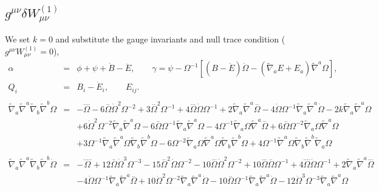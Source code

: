 \documentclass[10pt,letterpaper]{article}
\numberwithin{equation}{section}
\begin{document}
\subsection{$g^{\mu\nu}\delta W_{\mu\nu}^{(1)}$}
We set $k=0$ and substitute the gauge invariants and null trace condition ($g^{\mu\nu} W^{(1)}_{\mu\nu}=0$),
\begin{eqnarray}
\alpha &=& \phi + \psi +\dot B - \ddot E,\qquad \gamma = \psi -\Omega^{-1}[(B-\dot E)\dot\Omega - (\tilde\nabla_a E + E_a)\tilde\nabla^a \Omega],
\nonumber\\
Q_i&=& B_i - \dot E_i,\qquad E_{ij}.
\\\nonumber\\
\tilde\nabla_a\tilde\nabla^a\tilde\nabla_b\tilde\nabla^b\Omega &=& - \overset{....}{\Omega} - 6 \overset{..}{\Omega} \dot{\Omega}^2 \Omega^{-2} + 3 \overset{..}{\Omega}^2 \Omega^{-1} + 4 \overset{...}{\Omega} \dot{\Omega} \Omega^{-1} + 2 \tilde{\nabla}_{a}\tilde{\nabla}^{a}\overset{..}{\Omega} - 4 \dot{\Omega} \Omega^{-1} \tilde{\nabla}_{a}\tilde{\nabla}^{a}\dot{\Omega} - 2 k \tilde{\nabla}_{a}\tilde{\nabla}^{a}\Omega \nonumber \\ 
&& + 6 \dot{\Omega}^2 \Omega^{-2} \tilde{\nabla}_{a}\tilde{\nabla}^{a}\Omega - 6 \overset{..}{\Omega} \Omega^{-1} \tilde{\nabla}_{a}\tilde{\nabla}^{a}\Omega - 4 \Omega^{-1} \tilde{\nabla}_{a}\Omega \tilde{\nabla}^{a}\overset{..}{\Omega} + 6 \overset{..}{\Omega} \Omega^{-2} \tilde{\nabla}_{a}\Omega \tilde{\nabla}^{a}\Omega \nonumber \\ 
&& + 3 \Omega^{-1} \tilde{\nabla}_{a}\tilde{\nabla}^{a}\Omega \tilde{\nabla}_{b}\tilde{\nabla}^{b}\Omega - 6 \Omega^{-2} \tilde{\nabla}_{a}\Omega \tilde{\nabla}^{a}\Omega \tilde{\nabla}_{b}\tilde{\nabla}^{b}\Omega + 4 \Omega^{-1} \tilde{\nabla}^{a}\Omega \tilde{\nabla}_{b}\tilde{\nabla}^{b}\tilde{\nabla}_{a}\Omega 
\\\nonumber\\
\tilde\nabla_a\tilde\nabla^a\tilde\nabla_b\tilde\nabla^b\dot\Omega &=&  - \overset{.....}{\Omega} + 12 \overset{..}{\Omega} \dot{\Omega}^3 \Omega^{-3} - 15 \overset{..}{\Omega}^2 \dot{\Omega} \Omega^{-2} - 10 \overset{...}{\Omega} \dot{\Omega}^2 \Omega^{-2} + 10 \overset{...}{\Omega} \overset{..}{\Omega} \Omega^{-1} + 4 \overset{....}{\Omega} \dot{\Omega} \Omega^{-1} + 2 \tilde{\nabla}_{a}\tilde{\nabla}^{a}\overset{...}{\Omega} \nonumber \\ 
&& - 4 \dot{\Omega} \Omega^{-1} \tilde{\nabla}_{a}\tilde{\nabla}^{a}\overset{..}{\Omega} + 10 \dot{\Omega}^2 \Omega^{-2} \tilde{\nabla}_{a}\tilde{\nabla}^{a}\dot{\Omega} - 10 \overset{..}{\Omega} \Omega^{-1} \tilde{\nabla}_{a}\tilde{\nabla}^{a}\dot{\Omega} - 12 \dot{\Omega}^3 \Omega^{-3} \tilde{\nabla}_{a}\tilde{\nabla}^{a}\Omega \nonumber \\ 

\end{eqnarray}
\end{document}
